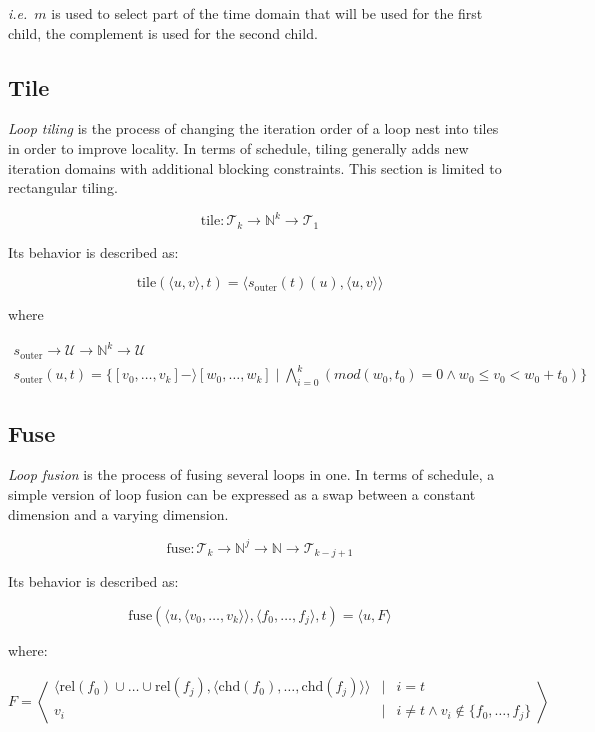 \documentclass{article}
\begin{document}
\noindent \emph{i.e.}\ $m$ is used to select part of the time domain that will
be used for the first child, the complement is used for the second child.

\subsection{Tile}

\emph{Loop tiling} is the process of changing the iteration order of a loop
nest into tiles in order to improve locality. In terms of schedule, tiling
generally adds new iteration domains with additional blocking constraints. This
section is limited to rectangular tiling.

\[
    \mathrm{tile}: \mathcal{T}_k \rightarrow \mathbb{N}^k \rightarrow \mathcal{T}_1
\]

Its behavior is described as:

\[
    \mathrm{tile}(\langle u, v\rangle, t) = \langle  s_\mathrm{outer}(t)(u), \langle  u, v \rangle \rangle
\]

\noindent where

\[
    \begin{array}{l}
        s_\mathrm{outer} \rightarrow \mathcal{U} \rightarrow \mathbb{N}^k \rightarrow \mathcal{U} \\
    s_\mathrm{outer}(u, t) = \{ [v_0, \ldots, v_k] -\rangle [w_0, \ldots, w_k] \mid \bigwedge_{i=0}^k(mod(w_0, t_0) = 0 \wedge w_0 \le v_0 < w_0 + t_0) \}
    \end{array}
\]

\subsection{Fuse}

\emph{Loop fusion} is the process of fusing several loops in one. In terms of
schedule, a simple version of loop fusion can be expressed as a swap between a
constant dimension and a varying dimension.

\[
    \mathrm{fuse}:  \mathcal{T}_k \rightarrow  \mathbb{N}^j \rightarrow \mathbb{N} \rightarrow  \mathcal{T}_{k - j + 1}
\]

Its behavior is described as: 

\[
    \mathrm{fuse}(\langle u, \langle v_0, \ldots, v_k\rangle \rangle, \langle f_0, \ldots, f_j\rangle, t) = \langle  u, F \rangle
\]

\noindent where:

\[
    F = \left\langle 
    \begin{array}{ccl}
         \langle \mathrm{rel}(f_0) \cup \ldots \cup \mathrm{rel}(f_j), \langle \mathrm{chd}(f_0), \ldots, \mathrm{chd}(f_j)\rangle  \rangle & \mid& i = t \\
         v_i & \mid& i \neq t \wedge  v_i \not\in \{f_0, \ldots, f_j\} \\
    \end{array}
    \right\rangle
\]
\end{document}
